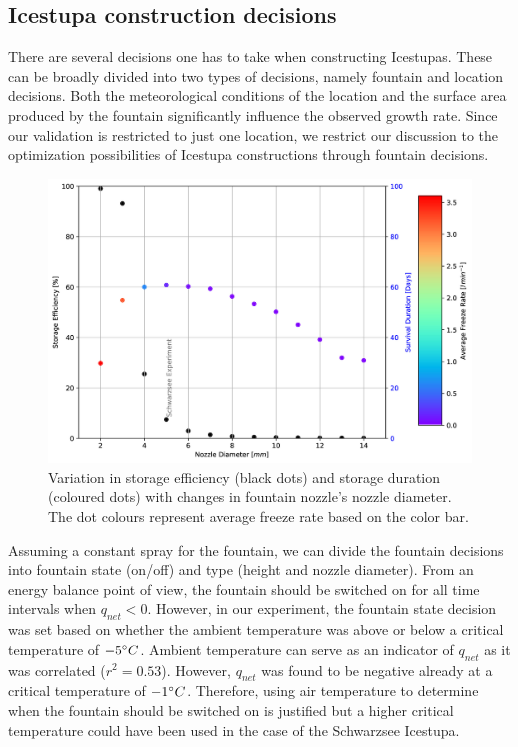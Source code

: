 \documentclass[utf8]{frontiersSCNS} %
\begin{document}
\subsection{Icestupa construction decisions} There are several decisions one has to take when constructing Icestupas.
These can be broadly divided into two types of decisions, namely fountain and location decisions.  Both the
meteorological conditions of the location and the surface area produced by the fountain significantly influence the
observed growth rate. Since our validation is restricted to just one location, we restrict our discussion to the
optimization possibilities of Icestupa constructions through fountain decisions.

  \begin{figure} \begin{center} \includegraphics[width=15 cm]{Figures/Figure_10.jpg} \end{center} \caption{Variation
in storage efficiency (black dots) and storage duration (coloured dots) with changes in fountain nozzle's nozzle
diameter.  The dot colours represent average freeze rate based on the color bar.} \label{fig:dia_f} \end{figure}
  

Assuming a constant spray for the fountain, we can divide the fountain decisions into fountain state (on/off) and type
(height and nozzle diameter).  From an energy balance point of view, the fountain should be switched on for all time
intervals when $q_{net} < 0$. However, in our experiment, the fountain state decision was set based on whether the
ambient temperature was above or below a critical temperature of $-5 \degree C$. Ambient temperature can serve as an
indicator of $q_{net}$ as it was correlated ($r^2 = 0.53$).  However, $q_{net}$ was found to be negative already at a
critical temperature of $-1 \degree C$. Therefore, using air temperature to determine when the fountain should be
switched on is justified but a higher critical temperature could have been used in the case of the Schwarzsee
Icestupa. 
\end{document}

